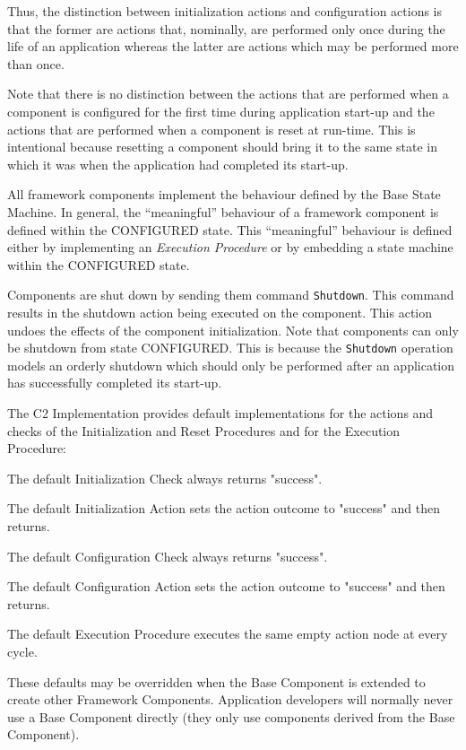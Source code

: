 \documentclass[a4paper,10pt]{article}
\newenvironment{fw_itemize}						%
{\begin{itemize}
  \setlength{\itemsep}{1mm}
  \setlength{\parskip}{0pt}
  \setlength{\parsep}{0pt}}
{\end{itemize}}
\begin{document}
Thus, the distinction between initialization actions and configuration actions is that the former are actions that, nominally, are performed only once during the life of an application whereas the latter are actions which may be performed more than once.

Note that there is no distinction between the actions that are performed when a component is configured for the first time during application start-up and the actions that are performed when a component is reset at run-time. This is intentional because resetting a component should bring it to the same state in which it was when the application had completed its start-up.

All framework components implement the behaviour defined by the Base State Machine. In general, the “meaningful” behaviour of a framework component is defined within the CONFIGURED state. This “meaningful” behaviour is defined either by implementing an \textit{Execution Procedure} or by embedding a state machine within the CONFIGURED state.

Components are shut down by sending them command \texttt{Shutdown}. This command results in the shutdown action being executed on the component. This action undoes the effects of the component initialization. Note that components can only be shutdown from state CONFIGURED. This is because the \texttt{Shutdown} operation models an orderly shutdown which should only be performed after an application has successfully completed its start-up. 

The C2 Implementation provides default implementations for the actions and checks of the Initialization and Reset Procedures and for the Execution Procedure:

\begin{fw_itemize}
\item The default Initialization Check always returns "success".
\item The default Initialization Action sets the action outcome to "success" and then returns.
\item The default Configuration Check always returns "success".
\item The default Configuration Action sets the action outcome to "success" and then returns.
\item The default Execution Procedure executes the same empty action node at every cycle.
\end{fw_itemize}

These defaults may be overridden when the Base Component is extended to create other Framework Components. Application developers will normally never use a Base Component directly (they only use components derived from the Base Component). 
\end{document}
